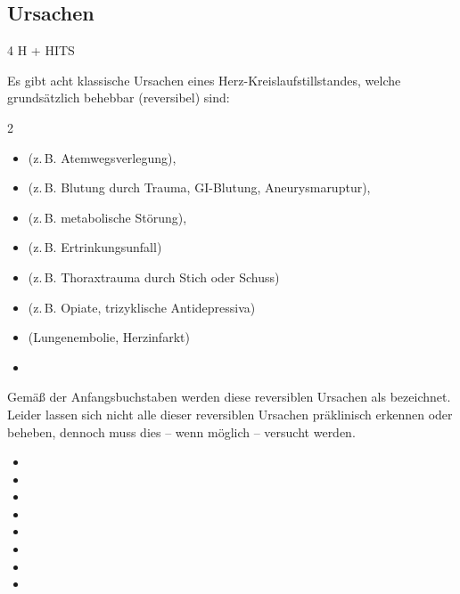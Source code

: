 
\clearpage%

\subsection{ Ursachen}

\TextSlide
{4 H + HITS}%
{%
Es gibt acht klassische Ursachen eines
Herz-Kreislaufstillstandes, welche grundsätzlich behebbar
(reversibel) sind:

\begin{multicols}{2}
\TableBaseModification
\begin{itemize}
  \item {}

  (z.\,B. Atemwegsverlegung),
  \item {}

  (z.\,B. Blutung durch Trauma,   GI-Blutung, Aneurysmaruptur),
  \item {}

  (z.\,B. metabolische Störung),
  \item {}

  (z.\,B. Ertrinkungsunfall)
  \item {}

  (z.\,B. Thoraxtrauma durch Stich oder Schuss)
  \item {}

  (z.\,B. Opiate, trizyklische Antidepressiva)
  \item {}

  (Lungenembolie, Herzinfarkt)
  \item {}
\end{itemize}
\end{multicols}

Gemäß der Anfangsbuchstaben werden diese reversiblen Ursachen als 
bezeichnet.
%
Leider lassen sich nicht alle dieser reversiblen Ursachen
präklinisch erkennen oder beheben, dennoch muss dies -- wenn
möglich -- versucht werden.
}%
{ %
\begin{itemize}
  \item {}
  \item {}
  \item {}
  \item {}
  \item {}
  \item {}
  \item {}
  \item {}
\end{itemize}
}



